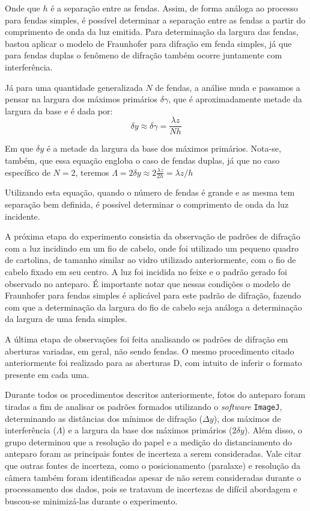 Onde que $h$ é a separação entre as fendas. Assim, de forma análoga ao processo para fendas simples, é possível determinar a separação entre as fendas a partir do comprimento de onda da luz emitida. Para determinação da largura das fendas, bastou aplicar o modelo de Fraunhofer para difração em fenda simples, já que para fendas duplas o fenômeno de difração também ocorre juntamente com interferência.

Já para uma quantidade generalizada $N$ de fendas, a análise muda e passamos a pensar na largura dos máximos primários $\delta\gamma$, que é aproximadamente metade da largura da base e é dada por:
\begin{equation}
    \delta y \approx \delta\gamma = \frac{\lambda z}{N h} \label{eq:mult}
\end{equation}

Em que $\delta y$ é a metade da largura da base dos máximos primários. Nota-se, também, que essa equação engloba o caso de fendas duplas, já que no caso específico de $N = 2$, teremos $\Lambda = 2 \delta y \approx 2 \frac{\lambda z}{2 h} = \lambda z / h$

Utilizando esta equação, quando o número de fendas é grande e as mesma tem separação bem definida, é possível determinar o comprimento de onda da luz incidente.

A próxima etapa do experimento consistia da observação de padrões de difração com a luz incidindo em um fio de cabelo, onde foi utilizado um pequeno quadro de cartolina, de tamanho similar ao vidro utilizado anteriormente, com o fio de cabelo fixado em seu centro. A luz foi incidida no feixe e o padrão gerado foi observado no anteparo. É importante notar que nessas condições o modelo de Fraunhofer para fendas simples é aplicável para este padrão de difração, fazendo com que a determinação da largura do fio de cabelo seja análoga a determinação da largura de uma fenda simples.

A última etapa de observações foi feita analisando os padrões de difração em aberturas variadas, em geral, não sendo fendas. O mesmo procedimento citado anteriormente foi realizado para as aberturas D, com intuito de inferir o formato presente em cada uma.

Durante todos os procedimentos descritos anteriormente, fotos do anteparo foram tiradas a fim de analisar os padrões formados utilizando o \textit{software} \texttt{ImageJ}\cite{ref:imagej}, determinando as distâncias dos mínimos de difração ($\Delta y$), dos máximos de interferência ($\Lambda$) e a largura da base dos máximos primários ($2 \delta y$). Além disso, o grupo determinou que a resolução do papel e a medição do distanciamento do anteparo foram as principais fontes de incerteza a serem consideradas. Vale citar que outras fontes de incerteza, como o posicionamento (paralaxe) e resolução da câmera também foram identificadas apesar de não serem consideradas durante o processamento dos dados, pois se tratavam de incertezas de difícil abordagem e buscou-se minimizá-las durante o experimento.


